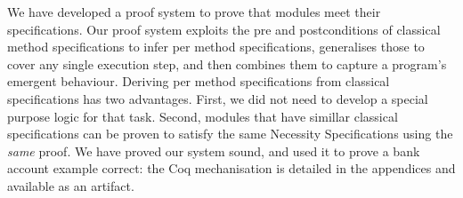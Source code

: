 We have developed a proof system to prove that modules meet their specifications.  Our proof system exploits the
pre and
postconditions of classical method specifications to infer per method \Nec specifications, 
generalises those to cover any single execution step,
and then combines them to capture a program's emergent behaviour.
%
%
%
%
%
Deriving per method \Nec specifications from classical specifications
has two advantages. First, we
did not need to develop a special purpose logic for that task. Second,
modules that have simillar classical 
specifications can be proven to satisfy the same Necessity
Specifications using the \emph{same} proof.
%
%
We have proved our system sound, and used it to
prove a bank account example correct: the Coq mechanisation is
detailed in the appendices and available as an artifact.

%
%
%
%

%
%






